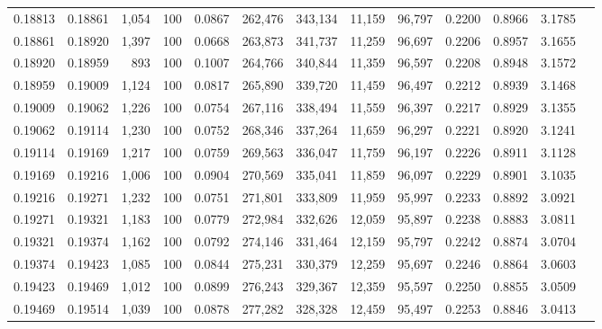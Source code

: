 \begin{tabular}{rrrrrrrrrrrrr}
0.18813 & 0.18861 & 1,054 & 100 &                                     0.0867 & 262,476 & 343,134 &  11,159 &  96,797 & 0.2200 & 0.8966 & 3.1785 \\
0.18861 & 0.18920 & 1,397 & 100 &                                     0.0668 & 263,873 & 341,737 &  11,259 &  96,697 & 0.2206 & 0.8957 & 3.1655 \\
0.18920 & 0.18959 &   893 & 100 &                                     0.1007 & 264,766 & 340,844 &  11,359 &  96,597 & 0.2208 & 0.8948 & 3.1572 \\
0.18959 & 0.19009 & 1,124 & 100 &                                     0.0817 & 265,890 & 339,720 &  11,459 &  96,497 & 0.2212 & 0.8939 & 3.1468 \\
0.19009 & 0.19062 & 1,226 & 100 &                                     0.0754 & 267,116 & 338,494 &  11,559 &  96,397 & 0.2217 & 0.8929 & 3.1355 \\
0.19062 & 0.19114 & 1,230 & 100 &                                     0.0752 & 268,346 & 337,264 &  11,659 &  96,297 & 0.2221 & 0.8920 & 3.1241 \\
0.19114 & 0.19169 & 1,217 & 100 &                                     0.0759 & 269,563 & 336,047 &  11,759 &  96,197 & 0.2226 & 0.8911 & 3.1128 \\
0.19169 & 0.19216 & 1,006 & 100 &                                     0.0904 & 270,569 & 335,041 &  11,859 &  96,097 & 0.2229 & 0.8901 & 3.1035 \\
0.19216 & 0.19271 & 1,232 & 100 &                                     0.0751 & 271,801 & 333,809 &  11,959 &  95,997 & 0.2233 & 0.8892 & 3.0921 \\
0.19271 & 0.19321 & 1,183 & 100 &                                     0.0779 & 272,984 & 332,626 &  12,059 &  95,897 & 0.2238 & 0.8883 & 3.0811 \\
0.19321 & 0.19374 & 1,162 & 100 &                                     0.0792 & 274,146 & 331,464 &  12,159 &  95,797 & 0.2242 & 0.8874 & 3.0704 \\
0.19374 & 0.19423 & 1,085 & 100 &                                     0.0844 & 275,231 & 330,379 &  12,259 &  95,697 & 0.2246 & 0.8864 & 3.0603 \\
0.19423 & 0.19469 & 1,012 & 100 &                                     0.0899 & 276,243 & 329,367 &  12,359 &  95,597 & 0.2250 & 0.8855 & 3.0509 \\
0.19469 & 0.19514 & 1,039 & 100 &                                     0.0878 & 277,282 & 328,328 &  12,459 &  95,497 & 0.2253 & 0.8846 & 3.0413 \\

\end{tabular}
